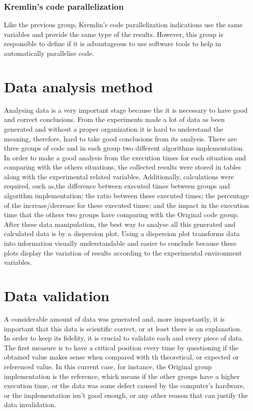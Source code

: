\subsubsection{Kremlin's code parallelization}

Like the previous group, Kremlin's code parallelization indications use the same variables and provide the same type of the results. However, this group is responsible to define if it is advantageous to use software tools to help in automatically parallelise code. 


\section{Data analysis method}

Analysing data is a very important stage because the it is necessary to have good and correct conclusions. From the experiments made a lot of data as been generated and without a proper organization it is hard to understand the meaning, therefore, hard to take good conclusions from its analysis. There are three groups of code and in each group two different algorithms implementation. In order to make a good analysis from the execution times for each situation and comparing with the others situations, the collected results were stored in tables along with the experimental related variables. Additionally, calculations were required, such as,the difference between executed times between groups and algorithm implementation; the ratio between these executed times; the percentage of the increase/decrease for these executed times; and the impact in the execution time that the others two groups have comparing with the Original code group. After these data manipulation, 
the best way to analyse all this generated and calculated data is by a dispersion plot. Using a dispersion plot transforms data into information visually understandable and easier to conclude because these plots display the variation of results according to the experimental environment variables.


\section{Data validation}

A considerable amount of data was generated and, more importantly, it is important that this data is scientific correct, or at least there is an explanation. In order to keep its fidelity, it is crucial to validate each and every piece of data. The first measure is to have a critical position every time by questioning if the obtained value makes sense when compared with th theoretical, or expected or referenced value. In this current case, for instance, the Original group implementation is the reference, which means if the other groups have a higher execution time, or the data was some defect caused by the computer's hardware, or the implementation isn't good enough, or any other reason that can justify the data invalidation.

